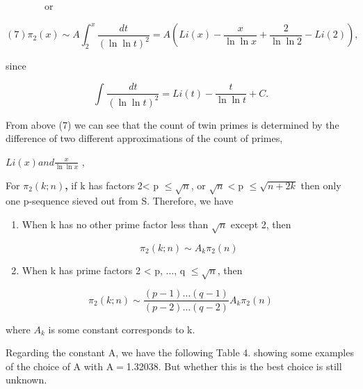 \documentclass{aomart}
\begin{document}
\ \ \ \ \ \ \ \ or

\begin{equation}
\left(7\right)                             \pi_{2}\left(x\right) \sim  A \int_{2}^{x}\frac{dt}{(\ln \ln  t)^{2}}  = A\left(Li\left(x\right)-\frac{x}{\ln \ln  x }+\frac{2}{\ln \ln  2 }-Li\left(2\right)\right) ,        
\end{equation}


since 

\begin{equation}
 \int_{}^{}\frac{dt}{(\ln \ln  t)^{2}} =  Li\left(t\right)-\frac{t}{\ln \ln  t }+C  .
\end{equation}

\vspace{1\baselineskip}

 From above (7) we can see that the count of twin primes is determined by the difference of two different approximations of the count of primes,
 
\vspace{1\baselineskip}

\( Li\left(x\right)  and \frac{x}{\ln \ln  x }\) ,

\vspace{1\baselineskip}

For \( \pi_{2}\left(k;n\right)\)\textbf{, }if k has factors 2< p $\leq$\( \sqrt{n}\),  or \(\sqrt{n}<\)p $\leq$\( \sqrt{n+2k} \) then only one p-sequence sieved out from S.  Therefore, we have 

\begin{enumerate}
	\item When k has no other prime factor less than \(\sqrt{n}\) except 2, then

\begin{equation}
\pi_{2}\left(k;n\right) \sim  A_{k} \pi_{2}\left(n\right)
\end{equation}
\vspace{1\baselineskip}

	\item When k has prime factors 2 < p, $\ldots$, q $\leq$\( \sqrt{n}\), then

\end{enumerate}
\begin{equation}
\pi_{2}\left(k;n\right) \sim \frac{\left(p-1\right)\ldots (q-1)  }{\left(p-2\right)\ldots (q-2)  } A_{k} \pi_{2}\left(n\right)
\end{equation}

\begin{flushleft}
where \( A_{k}\) is some constant corresponds to k.
\vspace{1\baselineskip}

Regarding the constant A, we have the following Table 4. showing some examples of the choice of A with A$=$1.32038.  But whether this is the best choice is still unknown. 
\end{flushleft}
\end{document}
